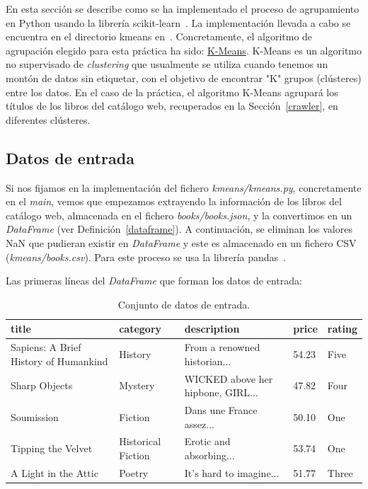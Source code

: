 \documentclass{uimppracticas}
\begin{document}
En esta sección se describe como se ha implementado el proceso de agrupamiento en Python usando la librería scikit-learn~\cite{scikit-learn}. La implementación llevada a cabo se encuentra en el directorio kmeans en~\cite{GitHubRepo}. Concretamente, el algoritmo de agrupación elegido para esta práctica ha sido:  \href{https://scikit-learn.org/stable/modules/generated/sklearn.cluster.KMeans.html}{K-Means}. K-Means es un algoritmo no supervisado de \textit{clustering} que usualmente se utiliza cuando tenemos un montón de datos sin etiquetar, con el objetivo de encontrar "K" grupos (clústeres) entre los datos. En el caso de la práctica, el algoritmo K-Means agrupará los títulos de los libros del catálogo web, recuperados en la Sección~\ref{crawler}, en diferentes clústeres.

\subsection{Datos de entrada}

Si nos fijamos en la implementación del fichero \textit{kmeans/kmeans.py}, concretamente en el \textit{main}, vemos que empezamos extrayendo la información de los libros del catálogo web, almacenada en el fichero \textit{books/books.json}, y la convertimos en un \textit{DataFrame} (ver Definición~\ref{dataframe}). A continuación, se eliminan los valores NaN que pudieran existir en \textit{DataFrame} y este es almacenado en un fichero CSV (\textit{kmeans/books.csv}). Para este proceso se usa la librería pandas~\cite{jeff_reback_2020_4309786}.

Las primeras líneas del \textit{DataFrame} que forman los datos de entrada:

\begin{table}[h]
	\begin{adjustbox}{width=\columnwidth,center}
		\begin{tabular}{lllll}
			\toprule
			title & category & description & price & rating \\
			\midrule
			Sapiens: A Brief History of Humankind & History & From a renowned historian... & 54.23 & Five \\
			Sharp Objects & Mystery & WICKED above her hipbone, GIRL... & 47.82 & Four \\
			Soumission & Fiction & Dans une France assez... & 50.10 & One \\
			Tipping the Velvet & Historical Fiction & Erotic and absorbing... & 53.74 & One \\
			A Light in the Attic & Poetry & It's hard to imagine... & 51.77 & Three \\
			\bottomrule
		\end{tabular}
	\end{adjustbox}
	\caption{Conjunto de datos de entrada.}
	\label{table1}
\end{table}
\end{document}
